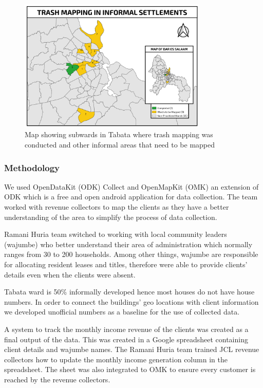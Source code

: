 \documentclass[a4paper,12pt,twoside]{article}
\begin{document}
\begin{figure}[h]
  \caption{Map showing subwards in Tabata where trash mapping was conducted and other informal areas that need to be mapped}
  \centering
 \includegraphics[width=0.8\textwidth]{images/JCL_Trash_Mapping.png}
\end{figure}

\subsubsection{Methodology}
\begin{multicols}{2}

We used OpenDataKit (ODK) Collect and OpenMapKit (OMK) an extension of ODK which is a free and open android application for data collection. The team worked with revenue collectors to map the clients as they have a better understanding of the area to simplify the process of data collection. 

Ramani Huria team switched to working with local community leaders (wajumbe) who better understand their area of administration which normally ranges from 30 to 200 households. Among other things, wajumbe  are responsible for allocating resident leases and titles, therefore were able to provide clients’ details even when the clients were absent.

Tabata ward is 50\% informally developed hence most houses do not have house numbers. In order to connect the buildings’ geo locations with client information we developed unofficial numbers as a baseline for the use of collected data.

A system to track the monthly income revenue of the clients was created as a final output of the data. This was created in a Google spreadsheet containing client details and wajumbe names. The Ramani Huria team trained JCL revenue collectors how to update the monthly income generation column in the spreadsheet. The sheet was also integrated to OMK to ensure every customer is reached by the revenue collectors.

\end{multicols}
\end{document}
